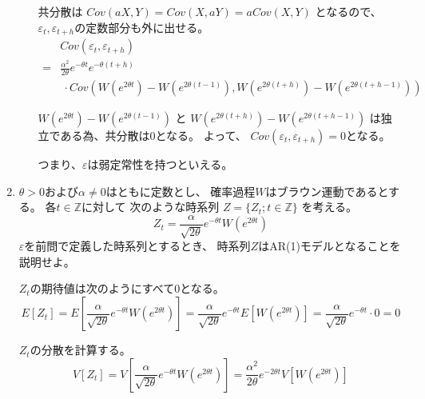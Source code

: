 \documentclass[12pt,b5paper]{ltjsarticle}
\begin{document}
\begin{enumerate}
\begin{enumerate}
             共分散は
             $Cov(aX,Y)=Cov(X,aY)=aCov(X,Y)$
             となるので、
             $\varepsilon_{t},\varepsilon_{t+h}$の定数部分も外に出せる。
             \begin{align}
              & Cov(\varepsilon_{t},\varepsilon_{t+h})\\
              =& \frac{\alpha^2}{2\theta}e^{-\theta t}e^{-\theta (t+h)}\\
             &\ \cdot Cov(
              W \left( e^{2\theta t} \right)-W \left( e^{2\theta (t-1)} \right),
              W \left( e^{2\theta (t+h)} \right)-W \left( e^{2\theta (t+h-1)} \right)
              )
             \end{align}

             $W \left( e^{2\theta t} \right)-W \left( e^{2\theta (t-1)} \right)$
             と
             $W \left( e^{2\theta (t+h)} \right)-W \left( e^{2\theta (t+h-1)} \right)$
             は独立である為、共分散は0となる。
             よって、
             $Cov(\varepsilon_{t},\varepsilon_{t+h}) =0$となる。

             つまり、$\varepsilon$は弱定常性を持つといえる。
             

             \hrulefill

      \end{enumerate}


 \item
      $\theta >0$および$\alpha \ne 0$はともに定数とし、
      確率過程$W$はブラウン運動であるとする。
      各$t\in\mathbb{Z}$に対して
      次のような時系列
      $Z=\{Z_{t};t\in\mathbb{Z}\}$
      を考える。
      \begin{equation}
       Z_{t}=\frac{\alpha}{\sqrt{2\theta}}e^{-\theta t}W(e^{2\theta t})
      \end{equation}
      $\varepsilon$を前問で定義した時系列とするとき、
      時系列$Z$はAR(1)モデルとなることを説明せよ。

      \dotfill

      $Z_{t}$の期待値は次のようにすべて0となる。
      \begin{equation}
       E[Z_{t}]=
        E\left[
          \frac{\alpha}{\sqrt{2\theta}}e^{-\theta t}W(e^{2\theta t})
         \right]
        =\frac{\alpha}{\sqrt{2\theta}}e^{-\theta t} E[W(e^{2\theta t})]
        =\frac{\alpha}{\sqrt{2\theta}}e^{-\theta t} \cdot 0
        =0
      \end{equation}

      $Z_{t}$の分散を計算する。
      \begin{equation}
       V[Z_{t}]=
        V\left[
          \frac{\alpha}{\sqrt{2\theta}}e^{-\theta t}W(e^{2\theta t})
         \right]
        =
        \frac{\alpha^2}{2\theta}e^{-2\theta t}
        V\left[ W(e^{2\theta t}) \right]
      \end{equation}


\end{enumerate}
\end{document}

